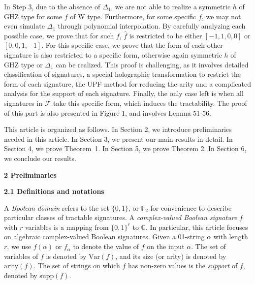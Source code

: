\documentclass[10pt,a4paper]{article}
\begin{document}
In Step 3, due to the absence of $\Delta_{1}$, we are not able to realize a symmetric $h$ of GHZ type for some $f$ of W type. Furthermore, for some specific $f$, we may not even simulate $\Delta_{1}$ through polynomial interpolation. By carefully analyzing each possible case, we prove that for such $f$, $\widehat{f}$ is restricted to be either $[-1,1,0,0]$ or $[0,0,1,-1]$. For this specific case, we prove that the form of each other signature is also restricted to a specific form, otherwise again symmetric $h$ of GHZ type or $\Delta_{1}$ can be realized. This proof is challenging, as it involves detailed classification of signatures, a special holographic transformation to restrict the form of each signature, the UPF method for reducing the arity and a complicated analysis for the support of each signature. Finally, the only case left is when all signatures in $\mathcal{F}$ take this specific form, which induces the tractability. The proof of this part is also presented in Figure 1, and involves Lemma 51-56.\par




This article is organized as follows.
In Section 2, we introduce preliminaries needed in this article.
In Section 3, we present our main results in detail.
In Section 4, we prove Theorem 1.
In Section 5, we prove Theorem 2.
In Section 6, we conclude our results.\par





\par\medskip\noindent\textbf{
2 Preliminaries}\par




\par\medskip\noindent\textbf{
2.1 Definitions and notations}\par




A \emph{Boolean domain} refers to the set $\{0,1\}$, or $\mathbb{F}_{2}$ for convenience to describe particular classes of tractable signatures. A \emph{complex-valued Boolean signature} $f$ with $r$ variables is a mapping from $\{0,1\}^{r}$ to $\mathbb{C}$. In particular, this article focuses on algebraic complex-valued Boolean signatures. Given a 01-string $\alpha$ with length $r$, we use $f(\alpha)$ or $f_{\alpha}$ to denote the value of $f$ on the input $\alpha$. The set of variables of $f$ is denoted by $\text{Var}(f)$, and its size (or arity) is denoted by $\text{arity}(f)$. The set of strings on which $f$ has non-zero values is the \emph{support} of $f$, denoted by $\text{supp}(f)$.\par
\end{document}
